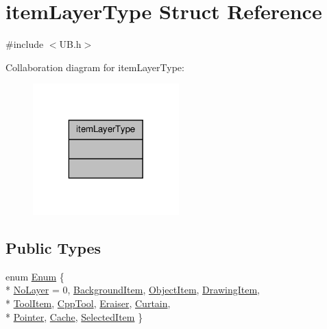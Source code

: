 \hypertarget{structitem_layer_type}{\section{item\-Layer\-Type Struct Reference}
\label{dc/d14/structitem_layer_type}
}


{\ttfamily \#include $<$U\-B.\-h$>$}



Collaboration diagram for item\-Layer\-Type\-:
\nopagebreak
\begin{figure}[H]
\begin{center}
\leavevmode
\includegraphics[width=160pt]{d4/db1/structitem_layer_type__coll__graph}
\end{center}
\end{figure}
\subsection*{Public Types}
\begin{DoxyCompactItemize}
\item 
enum \hyperlink{structitem_layer_type_a94572e74aaa23902038cf97f28ec5a4d}{Enum} \{ \\*
\hyperlink{structitem_layer_type_a94572e74aaa23902038cf97f28ec5a4da10984694cf95b3b668aa3299dcb644b7}{No\-Layer} =  0, 
\hyperlink{structitem_layer_type_a94572e74aaa23902038cf97f28ec5a4daad09e580d327bf96c8af8319f9bfd783}{Background\-Item}, 
\hyperlink{structitem_layer_type_a94572e74aaa23902038cf97f28ec5a4da04f8adf94396478eaad7a51dba7cec73}{Object\-Item}, 
\hyperlink{structitem_layer_type_a94572e74aaa23902038cf97f28ec5a4da11a3b59c8049e62fb302a6d3e4f7cb93}{Drawing\-Item}, 
\\*
\hyperlink{structitem_layer_type_a94572e74aaa23902038cf97f28ec5a4da3952af1d79fd862b12b68694b83e354e}{Tool\-Item}, 
\hyperlink{structitem_layer_type_a94572e74aaa23902038cf97f28ec5a4da21f89658948604baf4c7b0c69cbd59bb}{Cpp\-Tool}, 
\hyperlink{structitem_layer_type_a94572e74aaa23902038cf97f28ec5a4dab238ea398864c472ed43c95cfdb7432f}{Eraiser}, 
\hyperlink{structitem_layer_type_a94572e74aaa23902038cf97f28ec5a4da2f5be93ddf838cdb24cd3fba094d818a}{Curtain}, 
\\*
\hyperlink{structitem_layer_type_a94572e74aaa23902038cf97f28ec5a4da1b8be55bbf77b8743a87621730d0ef35}{Pointer}, 
\hyperlink{structitem_layer_type_a94572e74aaa23902038cf97f28ec5a4dac0b7e8dd7cfe41d0c713f7305fd0d661}{Cache}, 
\hyperlink{structitem_layer_type_a94572e74aaa23902038cf97f28ec5a4dad670c3e12808823a24f9e1bad75572b9}{Selected\-Item}
 \}
\end{DoxyCompactItemize}



